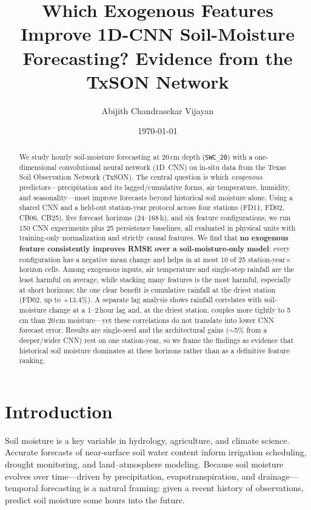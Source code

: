 \documentclass[11pt]{article}
\title{Which Exogenous Features Improve 1D-CNN Soil-Moisture\\
Forecasting? Evidence from the TxSON Network}
\author{Abijith Chandrasekar Vijayan}
\date{\today}
\begin{document}
\maketitle

\begin{abstract}
We study hourly soil-moisture forecasting at 20\,cm depth (\texttt{SWC\_20})
with a one-dimensional convolutional neural network (1D~CNN) on in-situ data
from the Texas Soil Observation Network (TxSON). The central question is which
\emph{exogenous} predictors---precipitation and its lagged/cumulative forms, air
temperature, humidity, and seasonality---most improve forecasts beyond
historical soil moisture alone. Using a shared CNN and a held-out station-year
protocol across four stations (FD11, FD02, CB06, CB25), five forecast horizons
(24--168\,h), and six feature configurations, we run 150 CNN experiments plus
25 persistence baselines, all evaluated in physical units with
training-only normalization and strictly causal features. We find that
\textbf{no exogenous feature consistently improves RMSE over a soil-moisture-only
model}: every configuration has a negative mean change and helps in at most
10 of 25 station-year$\times$horizon cells. Among exogenous inputs, air
temperature and single-step rainfall are the least harmful on average, while
stacking many features is the most harmful, especially at short horizons; the
one clear benefit is cumulative rainfall at the driest station (FD02, up to
$+13.4\%$). A separate lag analysis shows rainfall correlates with soil-moisture
change at a 1--2\,hour lag and, at the driest station, couples more tightly to
5\,cm than 20\,cm moisture---yet these correlations do not translate into lower
CNN forecast error. Results are single-seed and the architectural gains
($\sim$5\% from a deeper/wider CNN) rest on one station-year, so we frame the
findings as evidence that historical soil moisture dominates at these horizons
rather than as a definitive feature ranking.
\end{abstract}

\section{Introduction}

Soil moisture is a key variable in hydrology, agriculture, and climate science.
Accurate forecasts of near-surface soil water content inform irrigation
scheduling, drought monitoring, and land--atmosphere modeling. Because soil
moisture evolves over time---driven by precipitation, evapotranspiration, and
drainage---temporal forecasting is a natural framing: given a recent history of
observations, predict soil moisture some hours into the future.
\end{document}
